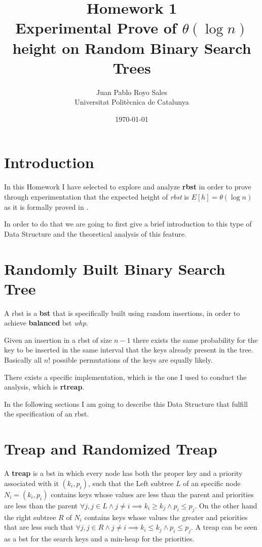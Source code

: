 \documentclass[12pt, a4paper]{article}
\title{%
      Homework 1 \\
      Experimental Prove of $\theta(\log n)$ height on Random Binary Search Trees
}
\author{%
  Juan Pablo Royo Sales \\
  \small{Universitat Politècnica de Catalunya}
}
\date\today
\begin{document}
\maketitle

\section{Introduction}
In this Homework I have selected to explore and analyze \textbf{\acrfull{rbst}} in order to prove through experimentation that the expected height of \textit{\acrshort{rbst}} is $E[h] = \theta(\log n)$ as it is formally proved in \cite{cormen}.

In order to do that we are going to first give a brief introduction to this type of Data Structure and the theoretical analysis of this feature.

\section{Randomly Built Binary Search Tree}
A \acrshort{rbst} is a \textbf{\acrfull{bst}} that is specifically built using random insertions, in order to achieve \textbf{balanced} \acrshort{bst} \textit{whp}.

Given an insertion in a \acrshort{rbst} of size $n - 1$ there exists the same probability for the key to be inserted in the same interval that the keys already present in the tree. Basically all $n{!}$ possible permutations of the keys are equally likely.

There exists a specific implementation, which is the one I used to conduct the analysis, which is \textbf{\acrfull{rtreap}}.

In the following sections I am going to describe this Data Structure that fulfill the specification of an \acrshort{rbst}.

\section{Treap and Randomized Treap}
A \textbf{\acrfull{treap}} is a \acrshort{bst} in which every node has both the proper key and a priority associated with it $(k_i, p_i)$, such that the Left subtree $L$ of an specific node $N_i = (k_i, p_i)$ contains keys whose values are less than the parent and priorities are less than the parent $\forall j, j \in L \land j \neq i \implies k_i \geq k_j \land p_i \leq p_j$. On the other hand the right subtree $R$ of $N_i$ contains keys whose values the greater and priorities that are less such that $\forall j, j \in R \land j \neq i \implies k_i \leq k_j \land p_i \leq p_j$. A \acrshort{treap} can be seen as a \acrshort{bst} for the search keys and a min-heap for the priorities.
\end{document}
